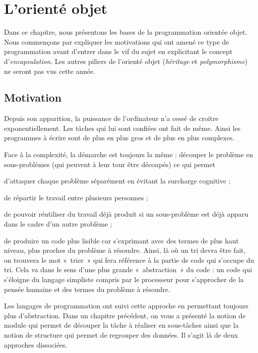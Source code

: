 \chapter{L'orienté objet}


		Dans ce chapitre, nous présentons les bases de la programmation orientée
		objet. Nous commençons par expliquer les motivations qui ont amené ce
		type de programmation avant d'entrer dans le vif du
		sujet en explicitant le concept
		d'\textit{encapsulation}. Les autres piliers de
		l'orienté objet (\textit{héritage} et
		\textit{polymorphisme}) ne seront pas vus cette année.


\section{Motivation}

	Depuis son apparition, la puissance de l'ordinateur
	n'a cessé de croitre exponentiellement. Les tâches qui
	lui sont confiées ont fait de même. Ainsi les programmes à écrire sont
	de plus en plus gros et de plus en plus complexes.
	
	Face à la complexité, la démarche est toujours la même : découper le
	problème en sous-problèmes (qui peuvent à leur tour être découpés) ce
	qui permet

	\begin{liste}
		\item 
			d'attaquer chaque problème séparément en évitant la
			surcharge cognitive ;
		\item 
			de répartir le travail entre plusieurs personnes ;
		\item 
			de pouvoir réutiliser du travail déjà produit si un sous-problème est
			déjà apparu dans le cadre d'un autre problème ;
		\item 
				de produire un code plus lisible car s'exprimant avec
				des termes de plus haut niveau, plus proches du problème à résoudre.
				Ainsi, là où un tri devra être fait, on trouvera le mot «~trier~» qui
				fera référence à la partie de code qui s’occupe du tri. Cela va dans le
				sens d’une plus grande «~abstraction~» du code : un code qui s’éloigne
				du langage simpliste compris par le processeur pour s’approcher de la
				pensée humaine et des termes du problème à résoudre.
	\end{liste}
	
	Les langages de programmation ont suivi cette approche en permettant
	toujours plus d’abstraction. Dans un chapitre précédent, on vous a
	présenté la notion de module qui permet de découper la tâche à réaliser
	en sous-tâches ainsi que la notion de structure qui permet de regrouper
	des données. Il s'agit là de deux approches	dissociées. 

